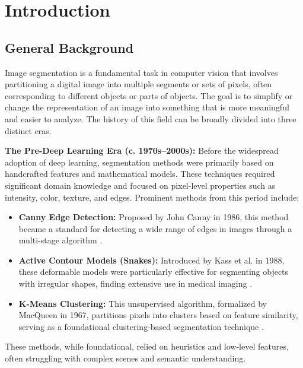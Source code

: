 \documentclass[conference]{IEEEtran}
\begin{document}
\section{Introduction}

\subsection{General Background}
Image segmentation is a fundamental task in computer vision that involves partitioning a digital image into multiple segments or sets of pixels, often corresponding to different objects or parts of objects. The goal is to simplify or change the representation of an image into something that is more meaningful and easier to analyze. The history of this field can be broadly divided into three distinct eras.

\textbf{The Pre-Deep Learning Era (c. 1970s--2000s):} Before the widespread adoption of deep learning, segmentation methods were primarily based on handcrafted features and mathematical models. These techniques required significant domain knowledge and focused on pixel-level properties such as intensity, color, texture, and edges. Prominent methods from this period include:
\begin{itemize}
	\item \textbf{Canny Edge Detection:} Proposed by John Canny in 1986, this method became a standard for detecting a wide range of edges in images through a multi-stage algorithm \cite{canny1986computational}.
	\item \textbf{Active Contour Models (Snakes):} Introduced by Kass et al. in 1988, these deformable models were particularly effective for segmenting objects with irregular shapes, finding extensive use in medical imaging \cite{kass1988snakes}.
	\item \textbf{K-Means Clustering:} This unsupervised algorithm, formalized by MacQueen in 1967, partitions pixels into clusters based on feature similarity, serving as a foundational clustering-based segmentation technique \cite{macqueen1967some}.
\end{itemize}
These methods, while foundational, relied on heuristics and low-level features, often struggling with complex scenes and semantic understanding.
\end{document}
